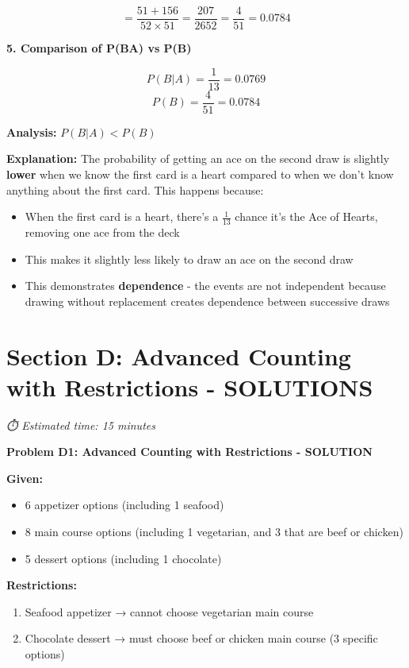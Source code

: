 \documentclass[
  11pt,
]{article}
\begin{document}
\[= \frac{51 + 156}{52 \times 51} = \frac{207}{2652} = \boxed{\frac{4}{51} = 0.0784}\]

\textbf{5. Comparison of P(B\textbar A) vs P(B)}

\[P(B|A) = \frac{1}{13} = 0.0769\] \[P(B) = \frac{4}{51} = 0.0784\]

\textbf{Analysis:} \(P(B|A) < P(B)\)

\textbf{Explanation:} The probability of getting an ace on the second
draw is slightly \textbf{lower} when we know the first card is a heart
compared to when we don't know anything about the first card. This
happens because:

\begin{itemize}
\item
  When the first card is a heart, there's a \(\frac{1}{13}\) chance it's
  the Ace of Hearts, removing one ace from the deck
\item
  This makes it slightly less likely to draw an ace on the second draw
\item
  This demonstrates \textbf{dependence} - the events are not independent
  because drawing without replacement creates dependence between
  successive draws
\end{itemize}

\section{Section D: Advanced Counting with Restrictions -
SOLUTIONS}\label{section-d-advanced-counting-with-restrictions---solutions}

\emph{⏱️ Estimated time: 15 minutes}

\textbf{Problem D1: Advanced Counting with Restrictions - SOLUTION}

\textbf{Given:}

\begin{itemize}
\item
  6 appetizer options (including 1 seafood)
\item
  8 main course options (including 1 vegetarian, and 3 that are beef or
  chicken)
\item
  5 dessert options (including 1 chocolate)
\end{itemize}

\textbf{Restrictions:}

\begin{enumerate}
\def\labelenumi{\arabic{enumi}.}
\item
  Seafood appetizer → cannot choose vegetarian main course
\item
  Chocolate dessert → must choose beef or chicken main course (3
  specific options)
\end{enumerate}
\end{document}

